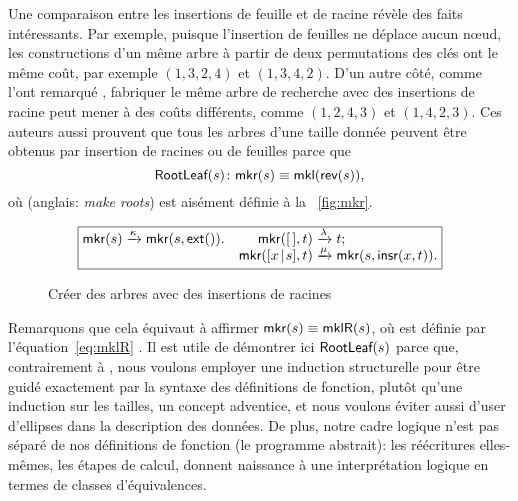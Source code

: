 Une comparaison entre les insertions de feuille et de racine révèle
des faits intéressants. Par exemple, puisque l'insertion de feuilles
ne déplace aucun nœud, les constructions d'un même arbre à partir
de deux permutations des clés ont le même coût, par exemple
\((1,3,2,4)\) et \((1,3,4,2)\). D'un autre côté, comme l'ont remarqué
\cite{GeldenhuysVanderMerwe_2009}, fabriquer le même arbre de
recherche avec des insertions de racine peut mener à des coûts
différents, comme \((1,2,4,3)\) et \((1,4,2,3)\). Ces auteurs aussi
prouvent que tous les arbres d'une taille donnée peuvent être obtenus
par insertion de racines ou de feuilles parce que
\begin{equation}
\pred{RootLeaf}{s} \colon \fun{mkr}(s) \equiv \fun{mkl}(\fun{rev}(s)),
\label{thm_RootLeaf}
\index{RootLeaf@\predName{RootLeaf}}
\end{equation}
où  
(anglais: \emph{make roots}) est aisément définie à la
\fig~\vref{fig:mkr}.
\begin{figure}
\begin{equation*}
\boxed{
\begin{array}{@{}r@{\;}l@{\;}lr@{\;}l@{\;}l@{}}
\fun{mkr}(s) & \xrightarrow{\smash{\kappa}} &
\fun{mkr}(s,\fun{ext}()).
& \fun{mkr}(\el,t) & \xrightarrow{\smash{\lambda}} & t;\\
&&&\fun{mkr}(\cons{x}{s},t) & \xrightarrow{\smash{\mu}} & \fun{mkr}(s,\fun{insr}(x,t)).
\end{array}}
\end{equation*}
\caption{Créer des arbres avec des insertions de racines}
\label{fig:mkr}
\end{figure}
Remarquons que cela équivaut à affirmer \(\textsf{mkr}(s) \equiv
\textsf{mklR}(s)\), où  est définie par
l'équation~\eqref{eq:mklR} . Il est utile de
démontrer ici \(\textsf{RootLeaf}({s})\) parce que, contrairement à
\cite{GeldenhuysVanderMerwe_2009}, nous voulons employer une induction
structurelle pour être guidé exactement par la syntaxe des définitions
de fonction, plutôt qu'une induction sur les tailles, un concept
adventice, et nous voulons éviter aussi d'user d'ellipses dans la
description des données. De plus, notre cadre logique n'est pas séparé
de nos définitions de fonction (le programme abstrait): les
réécritures elles-mêmes, les étapes de calcul, donnent naissance à
une interprétation logique en termes de classes d'équivalences.

